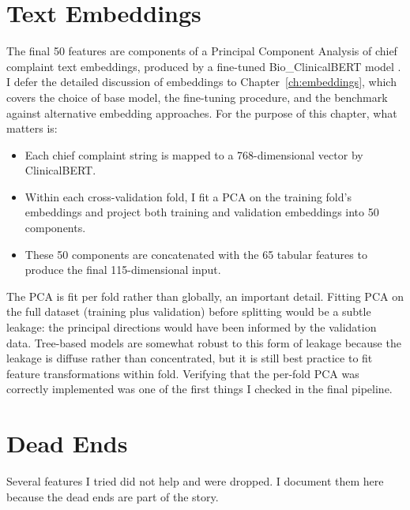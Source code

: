\section{Text Embeddings}

The final 50 features are components of a Principal Component Analysis of chief complaint text embeddings, produced by a fine-tuned Bio\_ClinicalBERT model \citep{alsentzer2019clinicalbert}. I defer the detailed discussion of embeddings to Chapter~\ref{ch:embeddings}, which covers the choice of base model, the fine-tuning procedure, and the benchmark against alternative embedding approaches. For the purpose of this chapter, what matters is:

\begin{itemize}
 \item Each chief complaint string is mapped to a 768-dimensional vector by ClinicalBERT.
 \item Within each cross-validation fold, I fit a PCA on the training fold's embeddings and project both training and validation embeddings into 50 components.
 \item These 50 components are concatenated with the 65 tabular features to produce the final 115-dimensional input.
\end{itemize}

The PCA is fit per fold rather than globally, an important detail. Fitting PCA on the full dataset (training plus validation) before splitting would be a subtle leakage: the principal directions would have been informed by the validation data. Tree-based models are somewhat robust to this form of leakage because the leakage is diffuse rather than concentrated, but it is still best practice to fit feature transformations within fold. Verifying that the per-fold PCA was correctly implemented was one of the first things I checked in the final pipeline.

\section{Dead Ends}

Several features I tried did not help and were dropped. I document them here because the dead ends are part of the story.


